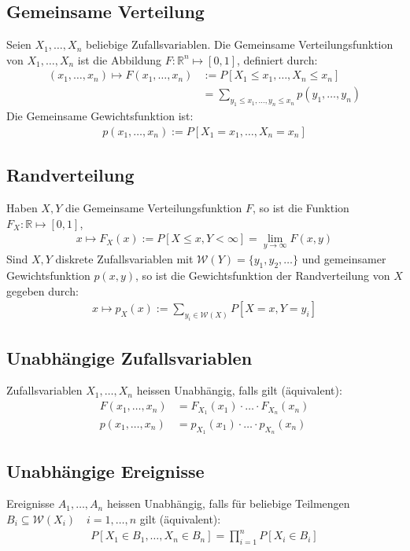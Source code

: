 \documentclass[8pt]{extarticle}
\newcommand{\R}{\mathbb{R}}
\newcommand{\W}{\mathcal{W}}
\newcommand{\ra}{\rightarrow}
\newcommand{\Pn}{\prod_{i = 1}^n}
\newcommand{\ereignisse}{A_1, \dots, A_n}
\newcommand{\zufallsvariablen}{X_1, \dots, X_n}
\begin{document}
\begin{multicols*}{3}
  \subsection*{Gemeinsame Verteilung}
  Seien $\zufallsvariablen$ beliebige Zufallsvariablen. Die Gemeinsame
  Verteilungsfunktion von $\zufallsvariablen$ ist die Abbildung
  $F: \R^n \mapsto [0, 1]$, definiert durch:
  \begin{align*}
    (x_1, \dots, x_n) \mapsto F(x_1, \dots, x_n) & := P[X_1 \leq x_1, \dots, X_n \leq x_n]                       \\
                                                 & = \sum_{y_1 \leq x_1, \dots, y_n \leq x_n} p(y_1, \dots, y_n)
  \end{align*}
  Die Gemeinsame Gewichtsfunktion ist:
  \begin{align*}
    p(x_1, \dots, x_n) := P[X_1 = x_1, \dots, X_n = x_n]
  \end{align*}
  \subsection*{Randverteilung}
  Haben $X, Y$ die Gemeinsame Verteilungsfunktion $F$, so ist die Funktion
  $F_X: \R \mapsto [0, 1]$,
  \begin{align*}
    x \mapsto F_X(x) := P[X \leq x, Y < \infty] = \lim_{y \ra \infty} F(x, y)
  \end{align*}
  Sind $X, Y$ diskrete Zufallsvariablen mit $\W(Y) = \{y_1, y_2, \dots\}$
  und gemeinsamer Gewichtsfunktion $p(x, y)$, so ist die Gewichtsfunktion
  der Randverteilung von $X$ gegeben durch:
  \begin{align*}
    x \mapsto p_X(x) := \sum_{y_i \in \W(X)} P[X = x, Y = y_i]
  \end{align*}
  \subsection*{Unabhängige Zufallsvariablen}
  Zufallsvariablen $\zufallsvariablen$ heissen Unabhängig, falls gilt
  (äquivalent):
  \begin{align*}
    F(x_1, \dots, x_n) & = F_{X_1}(x_1) \cdot \hdots \cdot F_{X_n}(x_n) \\
    p(x_1, \dots, x_n) & = p_{X_1}(x_1) \cdot \hdots \cdot p_{X_n}(x_n)
  \end{align*}
  \subsection*{Unabhängige Ereignisse}
  Ereignisse $\ereignisse$ heissen Unabhängig, falls für beliebige
  Teilmengen $B_i \subseteq \W(X_i) \quad i = 1, \dots, n$ gilt
  (äquivalent):
  \begin{align*}
    P[X_1 \in B_1, \dots, X_n \in B_n] = \Pn P[X_i \in B_i]
  \end{align*}

\end{multicols*}
\end{document}
